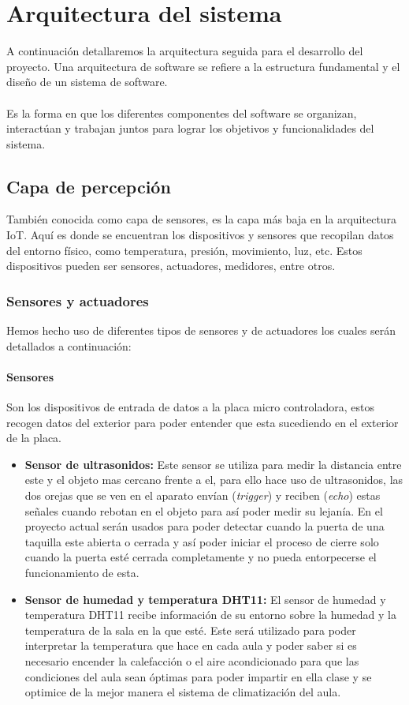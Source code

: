 \documentclass[12pt]{report}
\begin{document}
\chapter{Arquitectura del sistema}
A continuación detallaremos la arquitectura seguida para el desarrollo del proyecto. Una arquitectura de software se refiere a la estructura fundamental y el diseño de un sistema de software. 
\\\\Es la forma en que los diferentes componentes del software se organizan, interactúan y trabajan juntos para lograr los objetivos y funcionalidades del sistema.
\section{Capa de percepción}
También conocida como capa de sensores, es la capa más baja en la arquitectura IoT. Aquí es donde se encuentran los dispositivos y sensores que recopilan datos del entorno físico, como temperatura, presión, movimiento, luz, etc. Estos dispositivos pueden ser sensores, actuadores, medidores, entre otros.
\subsection{Sensores y actuadores}
Hemos hecho uso de diferentes tipos de sensores y de actuadores los cuales serán detallados a continuación:
\subsubsection{Sensores}
 Son los dispositivos de entrada de datos a la placa micro controladora, estos recogen datos del exterior para poder entender que esta sucediendo en el exterior de la placa. 
 \begin{itemize}
    \item \textbf{Sensor de ultrasonidos:} Este sensor se utiliza para medir la distancia entre este y el objeto mas cercano frente a el, para ello hace uso de ultrasonidos, las dos orejas que se ven en el aparato envían (\textit{trigger}) y reciben (\textit{echo}) estas señales cuando rebotan en el objeto para así poder medir su lejanía. En el proyecto actual serán usados para poder detectar cuando la puerta de una taquilla este abierta o cerrada y así poder iniciar el proceso de cierre solo cuando la puerta esté cerrada completamente y no pueda entorpecerse el funcionamiento de esta.
    \item \textbf{Sensor de humedad y temperatura DHT11:} El sensor de humedad y temperatura DHT11 recibe información de su entorno sobre la humedad y la temperatura de la sala en la que esté. Este será utilizado para poder interpretar la temperatura que hace en cada aula y poder saber si es necesario encender la calefacción o el aire acondicionado para que las condiciones del aula sean óptimas para poder impartir en ella clase y se optimice de la mejor manera el sistema de climatización del aula.
 \end{itemize}
\end{document}
